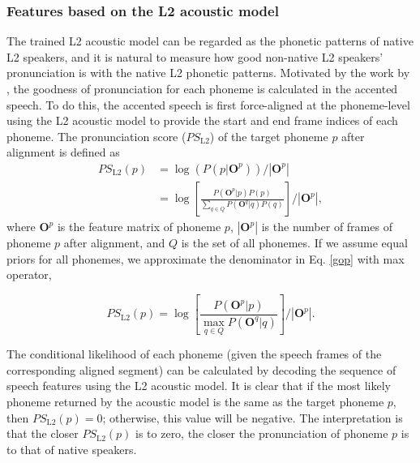 \subsubsection{Features based on the L2 acoustic model}
\label{sec:L2_measure}

The trained L2 acoustic model can be regarded as the phonetic patterns of native L2 speakers, and it is natural to measure how good non-native L2 speakers' pronunciation is with the native L2 phonetic patterns. Motivated by the work by \cite{witt2000phone}, the goodness of pronunciation for each phoneme is calculated in the accented speech. To do this, the accented speech is first force-aligned at the phoneme-level using the L2 acoustic model to provide the start and end frame indices of each phoneme. The pronunciation score ($PS_{\mathrm{L2}}$) of the target phoneme $p$ after alignment is defined as
\begin{equation}
\label{gop}
\begin{aligned}
PS_{\mathrm{L2}}(p) &= \log(P(p|\mathbf{O}^{p}))/\left | \mathbf{O}^{p} \right | \\
      &= \log \left [ \frac{P(\mathbf{O}^{p}|p)P(p)}{\sum_{q\in \mathit{Q}} P(\mathbf{O}^{q}|q)P(q)} \right ] /\left | \mathbf{O}^{p} \right |,
\end{aligned}
\end{equation}
where $\mathbf{O}^{p}$ is the feature matrix of phoneme $p$, $\left |\mathbf{O}^{p}\right |$ is the number of frames of phoneme $p$ after alignment, and $\mathit{Q}$ is the set of all phonemes. If we assume equal priors for all phonemes, we approximate the denominator in Eq. \ref{gop} with max operator,

\begin{equation}
\label{gop2}
PS_{\mathrm{L2}}(p) = \log \left [ \frac{P(\mathbf{O}^{p}|p)}{\max_{q\in \mathit{Q}} P(\mathbf{O}^{q}|q)} \right ] /\left | \mathbf{O}^{p} \right |.
\end{equation}

The conditional likelihood of each phoneme (given the speech frames of the corresponding aligned segment) can be calculated by decoding the sequence of speech features using the L2 acoustic model. It is clear that if the most likely phoneme returned by the acoustic model is the same as the target phoneme $p$, then $PS_{\mathrm{L2}}(p)=0$; otherwise, this value will be negative. The interpretation is that the closer $PS_{\mathrm{L2}}(p)$ is to zero, the closer the pronunciation of phoneme $p$ is to that of native speakers.

